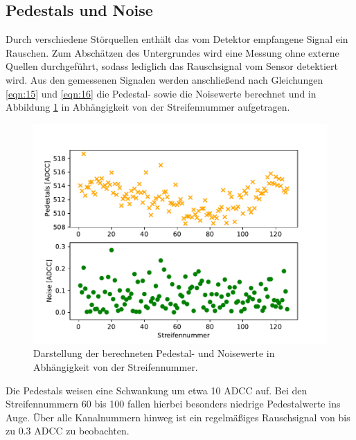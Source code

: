 \subsection{Pedestals und Noise}
\label{kap:Pedestal}
Durch verschiedene Störquellen enthält das vom Detektor empfangene Signal ein Rauschen. Zum Abschätzen des Untergrundes wird eine Messung ohne externe Quellen durchgeführt, sodass lediglich das Rauschsignal vom Sensor detektiert wird. Aus den gemessenen Signalen werden anschließend nach Gleichungen \eqref{eqn:15} und \eqref{eqn:16} die Pedestal- sowie die Noisewerte berechnet und in Abbildung \ref{fig:Pedestals} in Abhängigkeit von der Streifennummer aufgetragen.
\begin{figure}
  \centering
  \includegraphics[width=\textwidth]{plots/Pedestals_Noise.pdf}
  \caption{Darstellung der berechneten Pedestal- und Noisewerte in Abhängigkeit von der Streifennummer.}
  \label{fig:Pedestals}
\end{figure}
\FloatBarrier
Die Pedestals weisen eine Schwankung um etwa 10 ADCC auf. Bei den Streifennummern 60 bis 100 fallen hierbei besonders niedrige Pedestalwerte ins Auge.
Über alle Kanalnummern hinweg ist ein regelmäßiges Rauschsignal von bis zu 0.3 ADCC zu beobachten.

